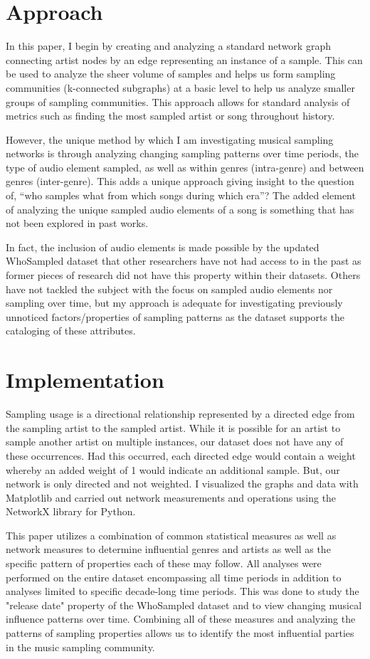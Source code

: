 \documentclass[pageno]{jpaper}
\begin{document}
\section{Approach}
In this paper, I begin by creating and analyzing a standard network graph connecting artist nodes by an edge representing an instance of a sample. This can be used to analyze the sheer volume of samples and helps us form sampling communities (k-connected subgraphs) at a basic level to help us analyze smaller groups of sampling communities. This approach allows for standard analysis of metrics such as finding the most sampled artist or song throughout history. 

However, the unique method by which I am investigating musical sampling networks is through analyzing changing sampling patterns over time periods, the type of audio element sampled, as well as within genres (intra-genre) and between genres (inter-genre). This adds a unique approach giving insight to the question of, “who samples what from which songs during which era”? The added element of analyzing the unique sampled audio elements of a song is something that has not been explored in past works. 

In fact, the inclusion of audio elements is made possible by the updated WhoSampled dataset that other researchers have not had access to in the past as former pieces of research did not have this property within their datasets. Others have not tackled the subject with the focus on sampled audio elements nor sampling over time, but my approach is adequate for investigating previously unnoticed factors/properties of sampling patterns as the dataset supports the cataloging of these attributes.

\section{Implementation}
Sampling usage is a directional relationship represented by a directed edge from the sampling artist to the sampled artist. While it is possible for an artist to sample another artist on multiple instances, our dataset does not have any of these occurrences. Had this occurred, each directed edge would contain a weight whereby an added weight of 1 would indicate an additional sample. But, our network is only directed and not weighted. I visualized the graphs and data with Matplotlib and carried out network measurements and operations using the NetworkX library for Python. \cite{NetworkX,Matplotlib}

This paper utilizes a combination of common statistical measures as well as network measures to determine influential genres and artists as well as the specific pattern of properties each of these may follow. All analyses were performed on the entire dataset encompassing all time periods in addition to analyses limited to specific decade-long time periods. This was done to study the "release date" property of the WhoSampled dataset and to view changing musical influence patterns over time. Combining all of these measures and analyzing the patterns of sampling properties allows us to identify the most influential parties in the music sampling community.
\end{document}
